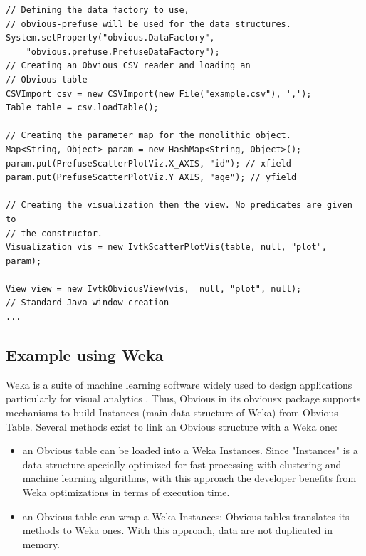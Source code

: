 \begin{lstlisting}
// Defining the data factory to use,
// obvious-prefuse will be used for the data structures.
System.setProperty("obvious.DataFactory",
    "obvious.prefuse.PrefuseDataFactory");
// Creating an Obvious CSV reader and loading an
// Obvious table
CSVImport csv = new CSVImport(new File("example.csv"), ',');
Table table = csv.loadTable();

// Creating the parameter map for the monolithic object.
Map<String, Object> param = new HashMap<String, Object>();
param.put(PrefuseScatterPlotViz.X_AXIS, "id"); // xfield
param.put(PrefuseScatterPlotViz.Y_AXIS, "age"); // yfield

// Creating the visualization then the view. No predicates are given to
// the constructor.
Visualization vis = new IvtkScatterPlotVis(table, null, "plot", param);

View view = new IvtkObviousView(vis,  null, "plot", null);
// Standard Java window creation
...
\end{lstlisting}

\subsection{Example using Weka}

Weka \cite{Weka} is a suite of machine learning software widely used to design applications particularly for visual analytics . Thus, Obvious in its obviousx package supports mechanisms to build Instances (main data structure of Weka) from Obvious Table. Several methods exist to link an Obvious structure with a Weka one:

\begin{itemize}
\item an Obvious table can be loaded into a Weka Instances. Since "Instances" is a data structure specially optimized for fast processing with clustering and machine learning algorithms, with this approach the developer benefits from Weka optimizations in terms of execution time.
\item an Obvious table can wrap a Weka Instances: Obvious tables translates its methods to Weka ones. With this approach, data are not duplicated in memory.
\end{itemize}

